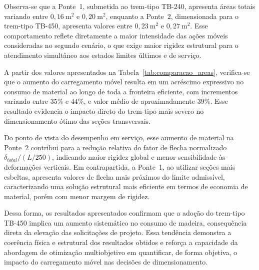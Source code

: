 Observa-se que a Ponte~1, submetida ao trem-tipo TB-240, apresenta áreas totais variando entre $0{,}16~\text{m}^2$ e $0{,}20~\text{m}^2$, enquanto a Ponte~2, dimensionada para o trem-tipo TB-450, apresenta valores entre $0{,}23~\text{m}^2$ e $0{,}27~\text{m}^2$. Esse comportamento reflete diretamente a maior intensidade das ações móveis consideradas no segundo cenário, o que exige maior rigidez estrutural para o atendimento simultâneo aos estados limites últimos e de serviço.

A partir dos valores apresentados na Tabela~\ref{tab:comparacao_areas}, verifica-se que o aumento do carregamento móvel resulta em um acréscimo expressivo no consumo de material ao longo de toda a fronteira eficiente, com incrementos variando entre $35\%$ e $44\%$, e valor médio de aproximadamente $39\%$. Esse resultado evidencia o impacto direto do trem-tipo mais severo no dimensionamento ótimo das seções transversais.

Do ponto de vista do desempenho em serviço, esse aumento de material na Ponte~2 contribui para a redução relativa do fator de flecha normalizado $\delta_{total}/(L/250)$, indicando maior rigidez global e menor sensibilidade às deformações verticais. Em contrapartida, a Ponte~1, ao utilizar seções mais esbeltas, apresenta valores de flecha mais próximos do limite admissível, caracterizando uma solução estrutural mais eficiente em termos de economia de material, porém com menor margem de rigidez.

Dessa forma, os resultados apresentados confirmam que a adoção do trem-tipo TB-450 implica um aumento sistemático no consumo de madeira, consequência direta da elevação das solicitações de projeto. Essa tendência demonstra a coerência física e estrutural dos resultados obtidos e reforça a capacidade da abordagem de otimização multiobjetivo em quantificar, de forma objetiva, o impacto do carregamento móvel nas decisões de dimensionamento.